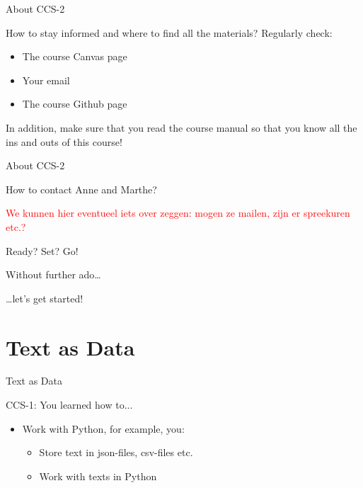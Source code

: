 \documentclass[handout]{beamer}
\begin{document}
\begin{frame}{About CCS-2} 
	
	How to stay informed and where to find all the materials? Regularly check:	
	\begin{itemize}
		\item The course Canvas page
		\item Your email
		\item The course Github page
	\end{itemize}

	In addition, make sure that you read the course manual so that you know all the ins and outs of this course!

\end{frame}


\begin{frame}{About CCS-2} 
	
	How to contact Anne and Marthe?	
	
	\textcolor{red}{We kunnen hier eventueel iets over zeggen: mogen ze mailen, zijn er spreekuren etc.?}
	
\end{frame}

\begin{frame}{Ready? Set? Go!} 
	
	Without further ado\dots
	
	\dots let's get started!
	
\end{frame}



\section{Text as Data}


\begin{frame}{Text as Data}
	
CCS-1: You learned how to...
	\begin{itemize}
	\item Work with Python, for example, you:
	\begin{itemize}
		\item Store text in json-files, csv-files etc.
		\item Work with texts in Python
	\end{itemize}
\end{itemize}
	
\end{frame}
\end{document}
